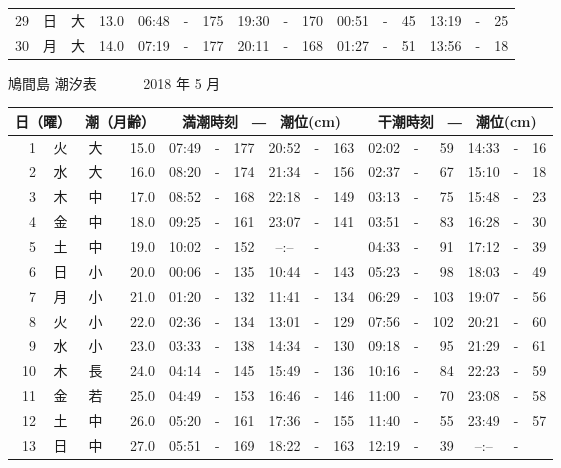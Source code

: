 \documentclass[12pt.a4j]{jsarticle}
\begin{document}
\begin{center}
\begin{table}[ht]
\begin{tabular}{|rc|cr|ccrccr|ccrccr|}
29 & 日 & 大 & 13.0 &  06:48 &-& 175  &  19:30 &-& 170  &   00:51 &-&  45  &   13:19 &-&  25  \\
30 & 月 & 大 & 14.0 &  07:19 &-& 177  &  20:11 &-& 168  &   01:27 &-&  51  &   13:56 &-&  18  \\
   \hline
   \end{tabular}
\end{table}
\newpage
 {\LARGE 鳩間島  潮汐表　　　}
 {\large 2018 年  5 月}\\
 \begin{table}[ht]
    \begin{tabular}{|rc|cr|ccrccr|ccrccr|}
    \hline
    \multicolumn{2}{|c|}{日（曜）} & \multicolumn{2}{c|}{潮（月齢）} & \multicolumn{6}{c|}{満潮時刻　―　潮位(cm)} & \multicolumn{6}{c|}{干潮時刻　―　潮位(cm)} \\
 \hline
 1 & 火 & 大 & 15.0 &  07:49 &-& 177  &  20:52 &-& 163  &   02:02 &-&  59  &   14:33 &-&  16  \\
 2 & 水 & 大 & 16.0 &  08:20 &-& 174  &  21:34 &-& 156  &   02:37 &-&  67  &   15:10 &-&  18  \\
 3 & 木 & 中 & 17.0 &  08:52 &-& 168  &  22:18 &-& 149  &   03:13 &-&  75  &   15:48 &-&  23  \\
 4 & 金 & 中 & 18.0 &  09:25 &-& 161  &  23:07 &-& 141  &   03:51 &-&  83  &   16:28 &-&  30  \\
 5 & 土 & 中 & 19.0 &  10:02 &-& 152  &  --:-- &-&     &   04:33 &-&  91  &   17:12 &-&  39  \\
 6 & 日 & 小 & 20.0 &  00:06 &-& 135  &  10:44 &-& 143  &   05:23 &-&  98  &   18:03 &-&  49  \\
 7 & 月 & 小 & 21.0 &  01:20 &-& 132  &  11:41 &-& 134  &   06:29 &-& 103  &   19:07 &-&  56  \\
 8 & 火 & 小 & 22.0 &  02:36 &-& 134  &  13:01 &-& 129  &   07:56 &-& 102  &   20:21 &-&  60  \\
 9 & 水 & 小 & 23.0 &  03:33 &-& 138  &  14:34 &-& 130  &   09:18 &-&  95  &   21:29 &-&  61  \\
10 & 木 & 長 & 24.0 &  04:14 &-& 145  &  15:49 &-& 136  &   10:16 &-&  84  &   22:23 &-&  59  \\
11 & 金 & 若 & 25.0 &  04:49 &-& 153  &  16:46 &-& 146  &   11:00 &-&  70  &   23:08 &-&  58  \\
12 & 土 & 中 & 26.0 &  05:20 &-& 161  &  17:36 &-& 155  &   11:40 &-&  55  &   23:49 &-&  57  \\
13 & 日 & 中 & 27.0 &  05:51 &-& 169  &  18:22 &-& 163  &   12:19 &-&  39  &   --:-- &-&     \\

\end{tabular}
\end{table}
\end{center}
\end{document}
